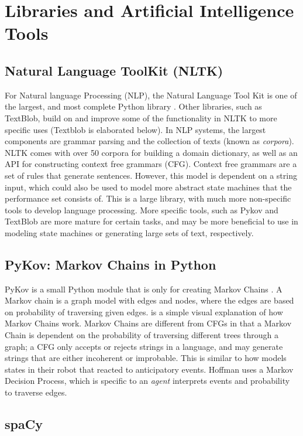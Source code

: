 \documentclass[onecolumn, draftclsnofoot,10pt, compsoc]{IEEEtran}
\begin{document}
\section{Libraries and Artificial Intelligence Tools}
  \subsection{Natural Language ToolKit (NLTK)}
    For Natural language Processing (NLP), the Natural Language Tool Kit is one of the largest, and most complete Python library \cite{nltk}. Other libraries, such as TextBlob, build on and improve some of the functionality in NLTK to more specific uses (Textblob is elaborated below). In NLP systems, the largest components are grammar parsing and the collection of texts (known as \textit{corpora}). NLTK comes with over 50 corpora for building a domain dictionary, as well as an API for constructing context free grammars (CFG). Context free grammars are a set of rules that generate sentences. However, this model is dependent on a string input, which could also be used to model more abstract state machines that the performance set consists of. This is a large library, with much more non-specific tools to develop language processing. More specific tools, such as Pykov and TextBlob are more mature for certain tasks, and may be more beneficial to use in modeling state machines or generating large sets of text, respectively.

  \subsection{PyKov: Markov Chains in Python}
    PyKov is a small Python module that is only for creating Markov Chains \cite{pykov}. A Markov chain is a graph model with edges and nodes, where the edges are based on probability of traversing given edges. \cite{visualmarkov} is a simple visual explanation of how Markov Chains work. Markov Chains are different from CFGs in that a Markov Chain is dependent on the probability of traversing different trees through a graph; a CFG only accepts or rejects strings in a language, and may generate strings that are either incoherent or improbable. This is similar to how \cite{hoffman2010anticipation} models states in their robot that reacted to anticipatory events. Hoffman uses a Markov Decision Process, which is specific to an \textit{agent} interprets events and probability to traverse edges. 

  \subsection{spaCy}
\end{document}
